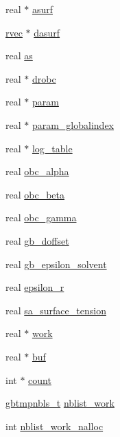\begin{DoxyCompactItemize}
\item 
real $\ast$ \hyperlink{structgmx__genborn__t_a9fdfe1c2743b615944245c62393901d9}{asurf}
\item 
\hyperlink{share_2template_2gromacs_2types_2simple_8h_aa02a552a4abd2f180c282a083dc3a999}{rvec} $\ast$ \hyperlink{structgmx__genborn__t_a1089572b88b78091e69af4e7ae54c863}{dasurf}
\item 
real \hyperlink{structgmx__genborn__t_a4bdf488d6b1a78ae74f16fc57d8bea5f}{as}
\item 
real $\ast$ \hyperlink{structgmx__genborn__t_aa15c54262661089f1078a917a1a550ba}{drobc}
\item 
real $\ast$ \hyperlink{structgmx__genborn__t_a7756f8b52972b3fd435dc519559b22b1}{param}
\item 
real $\ast$ \hyperlink{structgmx__genborn__t_aa36184d2b044ee346b8435c695e658bc}{param\-\_\-globalindex}
\item 
real $\ast$ \hyperlink{structgmx__genborn__t_aad6d00e2e4f3374badcbac3bf1a3e259}{log\-\_\-table}
\item 
real \hyperlink{structgmx__genborn__t_a92a9d6f74845d2af9a887b867f324606}{obc\-\_\-alpha}
\item 
real \hyperlink{structgmx__genborn__t_a22ea5657bdda4b5d87f321df8f9e973e}{obc\-\_\-beta}
\item 
real \hyperlink{structgmx__genborn__t_a876d648a9aec84ecf4b6b932b05655e6}{obc\-\_\-gamma}
\item 
real \hyperlink{structgmx__genborn__t_adc42b841a4de68f2ffcead3e4b4b974a}{gb\-\_\-doffset}
\item 
real \hyperlink{structgmx__genborn__t_a4d5a0d8d2bd57c15b9060a9e8bb24ded}{gb\-\_\-epsilon\-\_\-solvent}
\item 
real \hyperlink{structgmx__genborn__t_a8d8e2da5b006f6f91d8de2ffaf75fcd0}{epsilon\-\_\-r}
\item 
real \hyperlink{structgmx__genborn__t_af20c85c4aa313d97c82312f2e0ce6792}{sa\-\_\-surface\-\_\-tension}
\item 
real $\ast$ \hyperlink{structgmx__genborn__t_a5400ef71b3a74c780f5ac8676f2eb2a2}{work}
\item 
real $\ast$ \hyperlink{structgmx__genborn__t_a40f0eb7eb7ef91031558f5ae48e875fd}{buf}
\item 
int $\ast$ \hyperlink{structgmx__genborn__t_ab09f3ef1739ec7b725bb184422ceee10}{count}
\item 
\hyperlink{include_2types_2genborn_8h_a77961feee6dddd5bd41bb589d5e59b30}{gbtmpnbls\-\_\-t} \hyperlink{structgmx__genborn__t_a4deff873f586e29d6a26fdc28e704146}{nblist\-\_\-work}
\item 
int \hyperlink{structgmx__genborn__t_ab79502710e6c1c5884a040f4d2f29093}{nblist\-\_\-work\-\_\-nalloc}
\end{DoxyCompactItemize}


